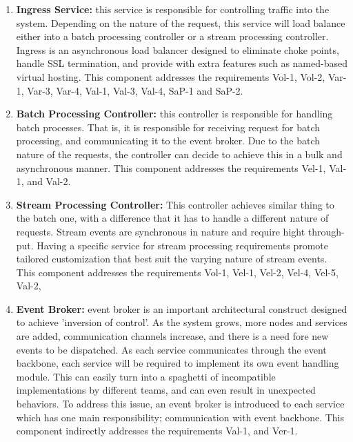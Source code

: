 \documentclass[conference]{IEEEtran}
\begin{document}
\begin{enumerate}
    \item \textbf{Ingress Service:} this service is responsible for controlling traffic into the system. Depending on the nature of the request, this service will load balance either into a batch processing controller or a stream processing controller. Ingress is an asynchronous load balancer designed to eliminate choke points, handle SSL termination, and provide with extra features such as named-based virtual hosting. This component addresses the requirements Vol-1, Vol-2, Var-1, Var-3, Var-4, Val-1, Val-3, Val-4, SaP-1 and SaP-2. 
    

    \item \textbf{Batch Processing Controller:} this controller is responsible for handling batch processes. That is, it is responsible for receiving request for batch processing, and communicating it to the event broker. Due to the batch nature of the requests, the controller can decide to achieve this in a bulk and asynchronous manner. This component addresses the requirements Vel-1, Val-1, and Val-2. 
    
    \item \textbf{Stream Processing Controller:} This controller achieves similar thing to the batch one, with a difference that it has to handle a different nature of requests. Stream events are synchronous in nature and require hight through-put. Having a specific service for stream processing requirements promote tailored customization that best suit the varying nature of stream events. This component addresses the requirements Vol-1, Vel-1, Vel-2, Vel-4, Vel-5, Val-2,  
    
    \item \textbf{Event Broker:} event broker is an important architectural construct designed to achieve 'inversion of control'. As the system grows, more nodes and services are added, communication channels increase, and there is a need fore new events to be dispatched. As each service communicates through the event backbone, each service will be required to implement its own event handling module. This can easily turn into a spaghetti of incompatible implementations by different teams, and can even result in unexpected behaviors. To address this issue, an event broker is introduced to each service which has one main responsibility; communication with event backbone. This component indirectly addresses the requirements Val-1, and Ver-1.  
    

\end{enumerate}
\end{document}
